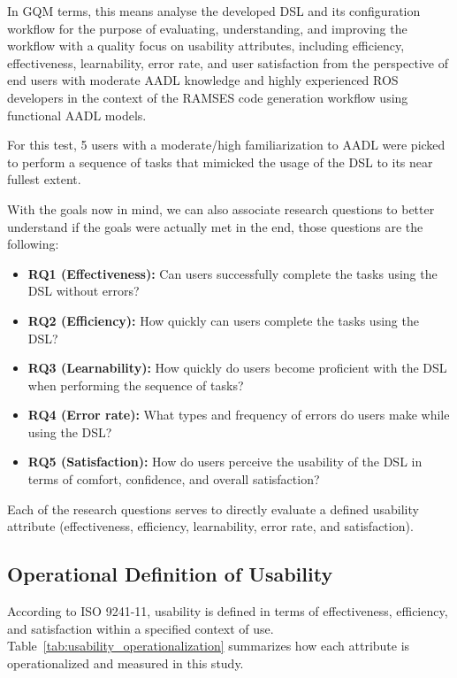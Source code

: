 In \gls{GQM} terms, this means analyse the developed DSL and its configuration workflow for the purpose of evaluating, understanding, and improving the workflow with a quality focus on usability attributes, including efficiency, effectiveness, learnability, error rate, and user satisfaction from the perspective of end users with moderate \gls{AADL} knowledge and highly experienced \gls{ROS} developers in the context of the \gls{RAMSES} code generation workflow using functional \gls{AADL} models.


For this test, 5 users with a moderate/high familiarization to \gls{AADL} were picked to perform a sequence of tasks that mimicked the usage of the \gls{DSL} to its near fullest extent.

With the goals now in mind, we can also associate research questions to better understand if the goals were actually met in the end, those questions are the following:

\begin{itemize}
	\item \textbf{RQ1 (Effectiveness):} Can users successfully complete the tasks using the \gls{DSL} without errors?
	\item \textbf{RQ2 (Efficiency):} How quickly can users complete the tasks using the \gls{DSL}?
	\item \textbf{RQ3 (Learnability):} How quickly do users become proficient with the \gls{DSL} when performing the sequence of tasks?
	\item \textbf{RQ4 (Error rate):} What types and frequency of errors do users make while using the \gls{DSL}?
	\item \textbf{RQ5 (Satisfaction):} How do users perceive the usability of the \gls{DSL} in terms of comfort, confidence, and overall satisfaction?
\end{itemize}

Each of the research questions serves to directly evaluate a defined usability attribute (effectiveness, efficiency, learnability, error rate, and satisfaction).

\subsection{Operational Definition of Usability}
\label{sec:test_op_def_usability}

According to \gls{ISO} 9241-11, usability is defined in terms of effectiveness, 
efficiency, and satisfaction within a specified context of use. 
Table~\ref{tab:usability_operationalization} summarizes how each attribute is 
operationalized and measured in this study.

